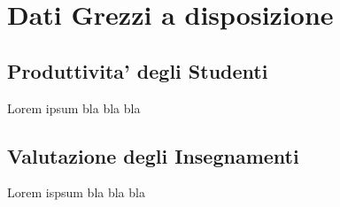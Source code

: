 \chapter{Dati Grezzi a disposizione}

\section{Produttivita' degli Studenti} %
	Lorem ipsum bla bla bla

\section{Valutazione degli Insegnamenti}
	Lorem ispsum bla bla bla

